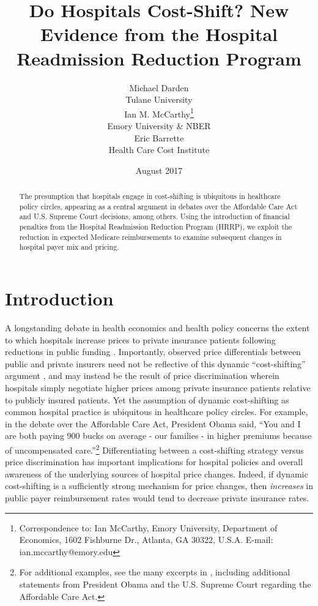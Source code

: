 \documentclass[12pt]{article}
\begin{document}
\title{Do Hospitals Cost-Shift? New Evidence from the Hospital Readmission Reduction Program}
\author{%
  Michael Darden \\[-1.5ex]
  Tulane University \\
  Ian M. McCarthy\thanks{Correspondence to: Ian McCarthy, Emory University, Department of Economics, 1602 Fishburne Dr., Atlanta, GA 30322, U.S.A. E-mail: ian.mccarthy@emory.edu} \\[-1.5ex]
  Emory University \& NBER \\
  Eric Barrette \\[-1.5ex]
  Health Care Cost Institute
}
\date{August 2017}

\maketitle

\begin{abstract}
The presumption that hospitals engage in cost-shifting is ubiquitous in healthcare policy circles, appearing as a central argument in debates over the Affordable Care Act and U.S. Supreme Court decisions, among others. Using the introduction of financial penalties from the Hospital Readmission Reduction Program (HRRP), we exploit the reduction in expected Medicare reimbursements to examine subsequent changes in hospital payer mix and pricing.
\end{abstract}

\vspace{-2ex}

\section{Introduction}
A longstanding debate in health economics and health policy concerns the extent to which hospitals increase prices to private insurance patients following reductions in public funding \citep{dranove1988}. Importantly, observed price differentials between public and private insurers need not be reflective of this dynamic ``cost-shifting'' argument \citep{morrisey1994}, and may instead be the result of price discrimination wherein hospitals simply negotiate higher prices among private insurance patients relative to publicly insured patients. Yet the assumption of dynamic cost-shifting as common hospital practice is ubiquitous in healthcare policy circles. For example, in the debate over the Affordable Care Act, President Obama said, ``You and I are both paying 900 bucks on average - our families - in higher premiums because of uncompensated care.''\footnote{For additional examples, see the many excerpts in \cite{dranove2017}, including additional statements from President Obama and the U.S. Supreme Court regarding the Affordable Care Act.} Differentiating between a cost-shifting strategy versus price discrimination has important implications for hospital policies and overall awareness of the underlying sources of hospital price changes. Indeed, if dynamic cost-shifting is a sufficiently strong mechanism for price changes, then \textit{increases} in public payer reimbursement rates would tend to decrease private insurance rates.
\end{document}
